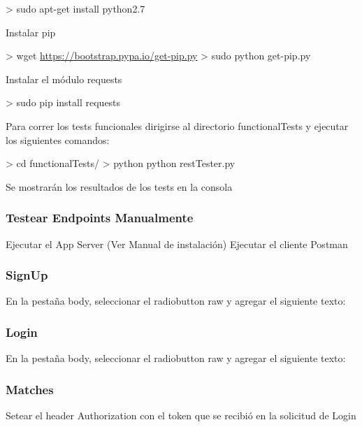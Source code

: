 \documentclass[letterpaper,10pt,english]{sphinxmanual}
\begin{document}
\textgreater{} sudo apt-get install python2.7

Instalar pip

\textgreater{} wget \href{https://bootstrap.pypa.io/get-pip.py}{https://bootstrap.pypa.io/get-pip.py}
\textgreater{} sudo python get-pip.py

Instalar el módulo requests

\textgreater{} sudo pip install requests

Para correr los tests funcionales dirigirse al directorio functionalTests y ejecutar los siguientes comandos:

\textgreater{} cd functionalTests/
\textgreater{} python python restTester.py

Se mostrarán los resultados de los tests en la consola


\subsubsection{Testear Endpoints Manualmente}
\label{manuals:testear-endpoints-manualmente}
Ejecutar el App Server (Ver Manual de instalación)
Ejecutar el cliente Postman


\subsubsection{SignUp}
\label{manuals:id3}

En la pestaña body, seleccionar el radiobutton raw y agregar el siguiente texto:



\subsubsection{Login}
\label{manuals:id4}

En la pestaña body, seleccionar el radiobutton raw y agregar el siguiente texto:



\subsubsection{Matches}
\label{manuals:matches}

Setear el header Authorization con el token que se recibió en la solicitud de Login
\end{document}
